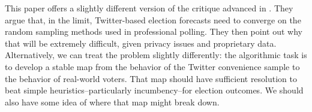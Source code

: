 \documentclass{acm_proc_article-sp}
\begin{document}
This paper offers a slightly different version of the critique
advanced in \cite{metaxas2011not}. They argue that, in the limit,
Twitter-based election forecasts need to converge on the random
sampling methods used in professional polling. They then point out why
that will be extremely difficult, given privacy issues and proprietary
data. Alternatively, we can treat the problem slightly differently:
the algorithmic task is to develop a stable map from the behavior of
the Twitter convenience sample to the behavior of real-world
voters. That map should have sufficient resolution to beat simple
heuristics--particularly incumbency--for election outcomes. We should
also have some idea of where that map might break down. 








\end{document}

